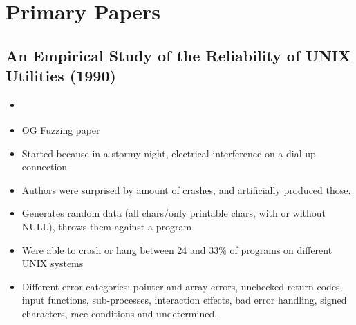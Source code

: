 \documentclass{article}
\begin{document}
\pagebreak
\section{Primary Papers}
\subsection{An Empirical Study of the Reliability of UNIX Utilities (1990)}
\begin{itemize}
    \item \cite{UNIX}
    \item OG Fuzzing paper
    \item Started because in a stormy night, electrical interference on a dial-up connection
    \item Authors were surprised by amount of crashes, and artificially produced those.
    \item Generates random data (all chars/only printable chars, with or without NULL), throws them against a program
    \item Were able to crash or hang between 24 and 33\% of programs on different UNIX systems
    \item Different error categories: pointer and array errors, unchecked return codes, input functions, sub-processes, interaction effects, bad error handling, signed characters, race conditions and undetermined.
\end{itemize}
\end{document}
